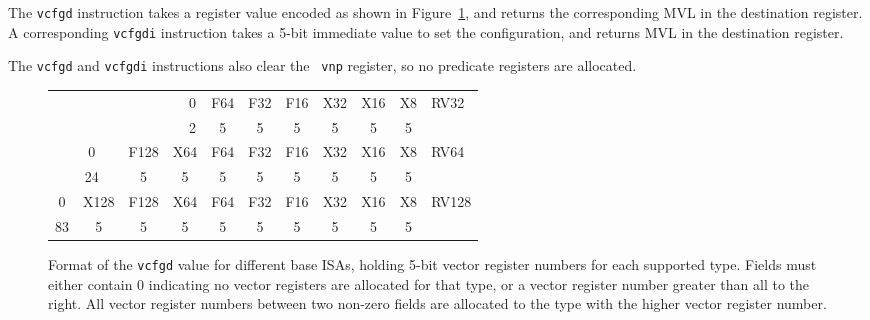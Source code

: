 The {\tt vcfgd} instruction takes a register value encoded as shown in
Figure~\ref{fig:vdcfg}, and returns the corresponding MVL in the
destination register.  A corresponding {\tt vcfgdi} instruction takes
a 5-bit immediate value to set the configuration, and returns MVL in
the destination register.

The {\tt vcfgd} and {\tt vcfgdi} instructions also clear the {\tt
  vnp} register, so no predicate registers are allocated.

\begin{figure}[hbt]
  \centering
  \begin{tabular}{p{2cm}p{2cm}ccc|c|c|c|c|c|c|c|l}
    \cline{6-12}
     &   &    &      &  & 0 & F64 & F32 & F16 & X32 & X16 & X8 & RV32 \\
    \cline{6-12}
    \multicolumn{1}{c}{} &
    \multicolumn{1}{c}{} &
    \multicolumn{1}{c}{} &
    \multicolumn{1}{c}{} & 
    \multicolumn{1}{c}{} &
    \multicolumn{1}{c}{2} &
    \multicolumn{1}{c}{5} &
    \multicolumn{1}{c}{5} &
    \multicolumn{1}{c}{5} &
    \multicolumn{1}{c}{5} &
    \multicolumn{1}{c}{5} &
    \multicolumn{1}{c}{5} &  \\
    \cline{2-12}
     & \multicolumn{2}{|c|}{0} & \multicolumn{1}{c|}{F128} & \multicolumn{2}{c|}{X64} & F64 & F32 & F16 & X32 & X16 & X8 & RV64 \\
    \cline{2-12}
    \multicolumn{1}{c}{} &
    \multicolumn{2}{c}{24} &
    \multicolumn{1}{c}{5} & 
    \multicolumn{2}{c}{5} &
    \multicolumn{1}{c}{5} &
    \multicolumn{1}{c}{5} &
    \multicolumn{1}{c}{5} &
    \multicolumn{1}{c}{5} &
    \multicolumn{1}{c}{5} &
    \multicolumn{1}{c}{5} &  \\
    \cline{1-12}
    \multicolumn{2}{|c|}{0} & \multicolumn{1}{c|}{X128} &
    \multicolumn{1}{c|}{F128} & \multicolumn{2}{c|}{X64} & F64 & F32 & F16 & X32 & X16 & X8 & RV128 \\
    \cline{1-12}
    \multicolumn{2}{c}{83} &
    \multicolumn{1}{c}{5} &
    \multicolumn{1}{c}{5} & 
    \multicolumn{2}{c}{5} &
    \multicolumn{1}{c}{5} &
    \multicolumn{1}{c}{5} &
    \multicolumn{1}{c}{5} &
    \multicolumn{1}{c}{5} &
    \multicolumn{1}{c}{5} &
    \multicolumn{1}{c}{5} &  \\
  \end{tabular}
  \caption{Format of the {\tt vcfgd} value for different base ISAs,
    holding 5-bit vector register numbers for each supported
    type. Fields must either contain 0 indicating no vector registers
    are allocated for that type, or a vector register number greater
    than all to the right.  All vector register numbers between two
    non-zero fields are allocated to the type with the higher vector
    register number. }
  \label{fig:vdcfg}
\end{figure}

